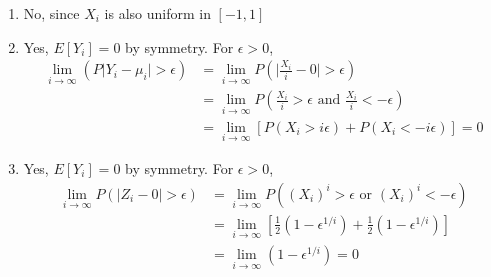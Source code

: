 \documentclass[../../probability-notes.tex]{subfiles}
\begin{document}
        \begin{enumerate}
            \item No, since $X_{i}$ is also uniform in $[-1,1]$
            \item Yes, $E[Y_{i}] = 0$ by symmetry. For $\epsilon > 0$,
            \begin{align*}
                \lim_{i \to \infty}(P\vert Y_{i} - \mu_{i} \vert > \epsilon) &= \lim_{i \to \infty} P(\vert \frac{X_{i}}{i} - 0 \vert > \epsilon)\\
                &= \lim_{i \to \infty} P(\frac{X_{i}}{i} > \epsilon \text{ and } \frac{X_{i}}{i} < -\epsilon)\\
                &= \lim_{i \to \infty} [P(X_{i} > i\epsilon) + P(X_{i} < -i\epsilon)] = 0
            \end{align*}
            \item Yes, $E[Y_{i}] = 0$ by symmetry. For $\epsilon > 0$,
            \begin{align*}
                \lim_{i \to \infty}P(\vert Z_{i} - 0 \vert > \epsilon) &= \lim_{i \to \infty}P((X_{i})^{i} > \epsilon \text{ or } (X_{i})^{i} < -\epsilon)\\
                &= \lim_{i \to \infty} [\frac{1}{2}(1 - \epsilon^{1/i}) + \frac{1}{2}(1 - \epsilon^{1/i})]\\
                &= \lim_{i \to \infty}(1 - \epsilon^{1/i}) = 0
            \end{align*}
        \end{enumerate}
\end{document}
